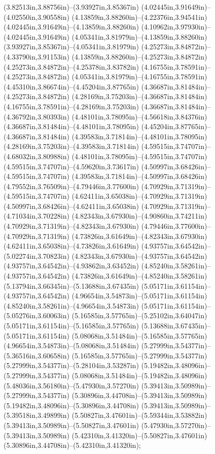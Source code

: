 (3.82513in,3.88756in)--(3.93927in,3.85367in) (4.02445in,3.91649in)--(4.02550in,3.90558in) (4.13859in,3.88260in)--(4.22376in,3.94541in) (4.02445in,3.91649in)--(4.13859in,3.88260in) (4.10962in,3.97930in)--(4.02445in,3.91649in) (4.05341in,3.81979in)--(4.13859in,3.88260in) (3.93927in,3.85367in)--(4.05341in,3.81979in) (4.25273in,3.84872in)--(4.33790in,3.91153in) (4.13859in,3.88260in)--(4.25273in,3.84872in) (4.25273in,3.84872in)--(4.25378in,3.83782in) (4.16755in,3.78591in)--(4.25273in,3.84872in) (4.05341in,3.81979in)--(4.16755in,3.78591in) (4.45310in,3.86674in)--(4.45204in,3.87765in) (4.36687in,3.81484in)--(4.25273in,3.84872in) (4.28169in,3.75203in)--(4.36687in,3.81484in) (4.16755in,3.78591in)--(4.28169in,3.75203in) (4.36687in,3.81484in)--(4.36792in,3.80393in) (4.48101in,3.78095in)--(4.56618in,3.84376in) (4.36687in,3.81484in)--(4.48101in,3.78095in) (4.45204in,3.87765in)--(4.36687in,3.81484in) (4.39583in,3.71814in)--(4.48101in,3.78095in) (4.28169in,3.75203in)--(4.39583in,3.71814in) (4.59515in,3.74707in)--(4.68032in,3.80988in) (4.48101in,3.78095in)--(4.59515in,3.74707in) (4.59515in,3.74707in)--(4.59620in,3.73617in) (4.50997in,3.68426in)--(4.59515in,3.74707in) (4.39583in,3.71814in)--(4.50997in,3.68426in) (4.79552in,3.76509in)--(4.79446in,3.77600in) (4.70929in,3.71319in)--(4.59515in,3.74707in) (4.62411in,3.65038in)--(4.70929in,3.71319in) (4.50997in,3.68426in)--(4.62411in,3.65038in) (4.70929in,3.71319in)--(4.71034in,3.70228in) (4.82343in,3.67930in)--(4.90860in,3.74211in) (4.70929in,3.71319in)--(4.82343in,3.67930in) (4.79446in,3.77600in)--(4.70929in,3.71319in) (4.73826in,3.61649in)--(4.82343in,3.67930in) (4.62411in,3.65038in)--(4.73826in,3.61649in) (4.93757in,3.64542in)--(5.02274in,3.70823in) (4.82343in,3.67930in)--(4.93757in,3.64542in) (4.93757in,3.64542in)--(4.93862in,3.63452in) (4.85240in,3.58261in)--(4.93757in,3.64542in) (4.73826in,3.61649in)--(4.85240in,3.58261in) (5.13794in,3.66345in)--(5.13688in,3.67435in) (5.05171in,3.61154in)--(4.93757in,3.64542in) (4.96654in,3.54873in)--(5.05171in,3.61154in) (4.85240in,3.58261in)--(4.96654in,3.54873in) (5.05171in,3.61154in)--(5.05276in,3.60063in) (5.16585in,3.57765in)--(5.25102in,3.64047in) (5.05171in,3.61154in)--(5.16585in,3.57765in) (5.13688in,3.67435in)--(5.05171in,3.61154in) (5.08068in,3.51484in)--(5.16585in,3.57765in) (4.96654in,3.54873in)--(5.08068in,3.51484in) (5.27999in,3.54377in)--(5.36516in,3.60658in) (5.16585in,3.57765in)--(5.27999in,3.54377in) (5.27999in,3.54377in)--(5.28104in,3.53287in) (5.19482in,3.48096in)--(5.27999in,3.54377in) (5.08068in,3.51484in)--(5.19482in,3.48096in) (5.48036in,3.56180in)--(5.47930in,3.57270in) (5.39413in,3.50989in)--(5.27999in,3.54377in) (5.30896in,3.44708in)--(5.39413in,3.50989in) (5.19482in,3.48096in)--(5.30896in,3.44708in) (5.39413in,3.50989in)--(5.39518in,3.49899in) (5.50827in,3.47601in)--(5.59344in,3.53882in) (5.39413in,3.50989in)--(5.50827in,3.47601in) (5.47930in,3.57270in)--(5.39413in,3.50989in) (5.42310in,3.41320in)--(5.50827in,3.47601in) (5.30896in,3.44708in)--(5.42310in,3.41320in);
